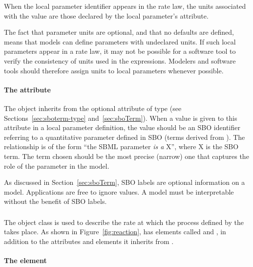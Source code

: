 When the local parameter identifier appears in the rate law, the units associated
with the value are those declared by the local parameter's  attribute.

The fact that parameter units are optional, and that no defaults
are defined, means that models can define parameters with
undeclared units.  If such local parameters appear in a rate law, it may not be possible for a
software tool to verify the consistency of units used in the
expressions.  Modelers and software tools should therefore assign
units to local parameters whenever possible.


\paragraph{The  attribute}

The \LocalParameter object inherits from \SBase the optional  attribute of
type  (see Sections~\ref{sec:sboterm-type}
and~\ref{sec:sboTerm}).  When a value is given to this attribute in a
local parameter definition, the value should be an SBO identifier
referring to a quantitative parameter defined in SBO (\ie terms
derived from \sboparameter).  The relationship is of the form
``the SBML parameter \emph{is a} X'', where X is the SBO term.
The term chosen should be the most precise (narrow) one that
captures the role of the parameter in the model.

As discussed in Section~\ref{sec:sboTerm}, SBO labels are optional
information on a model.  Applications are free to ignore
 values.  A model must be interpretable without the
benefit of SBO labels.


\subsubsection{}
\label{subsec:kinetic-law}
\label{subsec:listoflocalparameters}

The \KineticLaw object class is used to describe the rate at which
the process defined by the \Reaction takes place.  As shown in
Figure~\vref{fig:reaction}, \KineticLaw has elements called
 and , in addition to the
attributes and elements it inherits from \SBase.

\paragraph{The  element}


